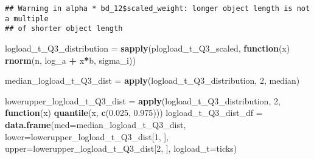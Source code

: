 \documentclass[
]{article}
\newenvironment{Shaded}{\begin{snugshade}}{\end{snugshade}}
\newcommand{\AttributeTok}[1]{\textcolor[rgb]{0.13,0.29,0.53}{#1}}
\newcommand{\ControlFlowTok}[1]{\textcolor[rgb]{0.13,0.29,0.53}{\textbf{#1}}}
\newcommand{\DecValTok}[1]{\textcolor[rgb]{0.00,0.00,0.81}{#1}}
\newcommand{\FloatTok}[1]{\textcolor[rgb]{0.00,0.00,0.81}{#1}}
\newcommand{\FunctionTok}[1]{\textcolor[rgb]{0.13,0.29,0.53}{\textbf{#1}}}
\newcommand{\NormalTok}[1]{#1}
\newcommand{\OtherTok}[1]{\textcolor[rgb]{0.56,0.35,0.01}{#1}}
\newcommand{\SpecialCharTok}[1]{\textcolor[rgb]{0.81,0.36,0.00}{\textbf{#1}}}
\begin{document}
\begin{Shaded}
\end{Shaded}

\begin{verbatim}
## Warning in alpha * bd_12$scaled_weight: longer object length is not a multiple
## of shorter object length
\end{verbatim}

\begin{Shaded}
\begin{Highlighting}[]
\NormalTok{logload\_t\_Q3\_distribution }\OtherTok{=} \FunctionTok{sapply}\NormalTok{(plogload\_t\_Q3\_scaled, }\ControlFlowTok{function}\NormalTok{(x) }\FunctionTok{rnorm}\NormalTok{(n, log\_a }\SpecialCharTok{+}\NormalTok{ x}\SpecialCharTok{*}\NormalTok{b, sigma\_i))}

\NormalTok{median\_logload\_t\_Q3\_dist }\OtherTok{=} \FunctionTok{apply}\NormalTok{(logload\_t\_Q3\_distribution, }\DecValTok{2}\NormalTok{, median)}

\NormalTok{lowerupper\_logload\_t\_Q3\_dist }\OtherTok{=} \FunctionTok{apply}\NormalTok{(logload\_t\_Q3\_distribution, }\DecValTok{2}\NormalTok{, }\ControlFlowTok{function}\NormalTok{(x) }\FunctionTok{quantile}\NormalTok{(x, }\FunctionTok{c}\NormalTok{(}\FloatTok{0.025}\NormalTok{, }\FloatTok{0.975}\NormalTok{)))}
\NormalTok{logload\_t\_Q3\_dist\_df }\OtherTok{=} \FunctionTok{data.frame}\NormalTok{(}\AttributeTok{med=}\NormalTok{median\_logload\_t\_Q3\_dist, }
                     \AttributeTok{lower=}\NormalTok{lowerupper\_logload\_t\_Q3\_dist[}\DecValTok{1}\NormalTok{, ], }
                     \AttributeTok{upper=}\NormalTok{lowerupper\_logload\_t\_Q3\_dist[}\DecValTok{2}\NormalTok{, ],}
                     \AttributeTok{logload\_t=}\NormalTok{ticks)}


\end{Highlighting}
\end{Shaded}
\end{document}
